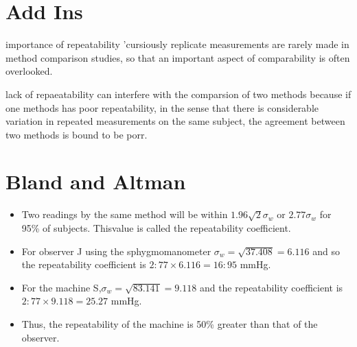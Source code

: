 \documentclass[Chap2cmain.tex]{subfiles}
\begin{document}
\section{Add Ins}
importance of repeatability
'cursiously replicate measurements are rarely made in method comparison studies, so that an important aspect of comparability is 
often overlooked.

lack of repaeatability can interfere with the comparsion of two methods because if one methods has poor repeatability, in the sense that there is
considerable variation in repeated measurements on the same subject, the agreement between two methods is bound to be porr.



\section{Bland and Altman}
\begin{itemize}
	\item Two readings by the same method will be within $1.96
	\sqrt{2} \sigma_w $ or $2.77 \sigma_w $ for 95\% of subjects. Thisvalue is called the repeatability coefficient.
	
	\item For observer J using the sphygmomanometer $ \sigma_w = \sqrt{37.408} = 6.116$ and so the repeatability coefficient is
	$2:77 \times 6.116 = 16:95$ mmHg.
	
	\item For the machine S,$ \sigma_w = \sqrt{83.141} = 9.118$ and the repeatability coefficient is $2:77 \times 9.118 = 25.27$ mmHg.
	
	\item Thus, the repeatability of the machine is 50\% greater than that of the observer.
\end{itemize}
\end{document}
